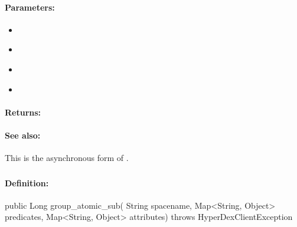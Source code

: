 \paragraph{Parameters:}
\begin{itemize}[noitemsep]
\item {}\\

\item {}\\

\item {}\\

\item {}\\

\end{itemize}

\paragraph{Returns:}


\paragraph{See also:}  This is the asynchronous form of .

\pagebreak
\subsubsection{}
\label{api:java:group_atomic_sub}


\paragraph{Definition:}
\begin{javacode}
public Long group_atomic_sub(
        String spacename,
        Map<String, Object> predicates,
        Map<String, Object> attributes) throws HyperDexClientException
\end{javacode}

